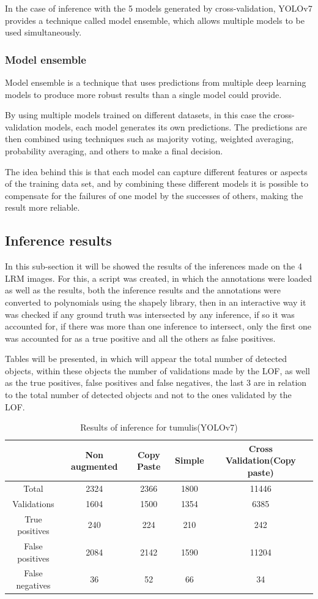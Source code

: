 In the case of inference with the 5 models generated by cross-validation, YOLOv7 provides a technique called model ensemble, which allows multiple models to be used simultaneously.

\subsubsection{Model ensemble}
Model ensemble is a technique that uses predictions from multiple deep learning models to produce more robust results than a single model could provide.

By using multiple models trained on different datasets, in this case the cross-validation models, each model generates its own predictions. The predictions are then combined using techniques such as majority voting, weighted averaging, probability averaging, and others to make a final decision.

The idea behind this is that each model can capture different features or aspects of the training data set, and by combining these different models it is possible to compensate for the failures of one model by the successes of others, making the result more reliable.



\subsection{Inference results}
In this sub-section it will be showed the results of the inferences made on the 4 LRM images. For this, a script was created, in which the annotations were loaded as well as the results, both the inference results and the annotations were converted to polynomials using the shapely library, then in an interactive way it was checked if any ground truth was intersected by any inference, if so it was accounted for, if there was more than one inference to intersect, only the first one was accounted for as a true positive and all the others as false positives.

Tables will be presented, in which will appear the total number of detected objects, within these objects the number of validations made by the LOF, as well as the true positives, false positives and false negatives, the last 3 are in relation to the total number of detected objects and not to the ones validated by the LOF.

\begin{table}[h!]
\centering
\begin{tabular}{|c c c c c|} 
 \hline
  & Non augmented  & Copy Paste & Simple & Cross Validation(Copy paste) \\ [0.5ex] 
 \hline\hline
 Total & 2324 & 2366 & 1800 & 11446 \\ 
 Validations & 1604 & 1500 & 1354 & 6385 \\
 True positives & 240 & 224 & 210 & 242 \\
 False positives & 2084 & 2142 & 1590 & 11204 \\
 False negatives & 36 & 52 & 66 & 34 \\ [1ex] 
 \hline
\end{tabular}
\caption{Results of inference for tumulis(YOLOv7)}
\end{table}

